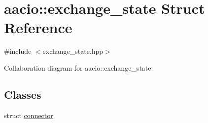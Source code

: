 \hypertarget{structaacio_1_1exchange__state}{}\section{aacio\+:\+:exchange\+\_\+state Struct Reference}
\label{structaacio_1_1exchange__state}


{\ttfamily \#include $<$exchange\+\_\+state.\+hpp$>$}



Collaboration diagram for aacio\+:\+:exchange\+\_\+state\+:
\subsection*{Classes}
\begin{DoxyCompactItemize}
\item 
struct \mbox{\hyperlink{structaacio_1_1exchange__state_1_1connector}{connector}}
\end{DoxyCompactItemize}
